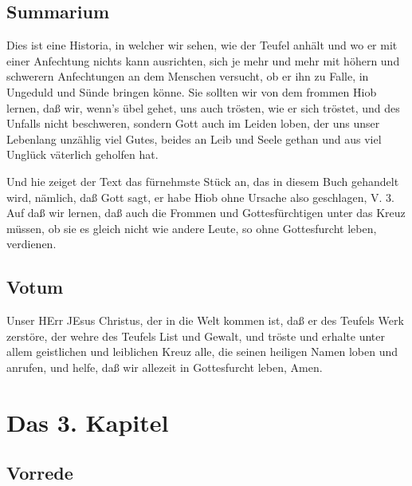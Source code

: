 \section{Summarium}

Dies ist eine Historia, in welcher wir sehen, wie der Teufel anhält und wo er mit einer Anfechtung nichts kann ausrichten, sich je mehr und mehr mit höhern und schwerern Anfechtungen an dem Menschen versucht, ob er ihn zu Falle, in Ungeduld und Sünde bringen könne. Sie sollten wir von dem frommen Hiob lernen, daß wir, wenn's übel gehet, uns auch trösten, wie er sich tröstet, und des Unfalls nicht beschweren, sondern Gott auch im Leiden loben, der uns unser Lebenlang unzählig viel Gutes, beides an Leib und Seele gethan und aus viel Unglück väterlich geholfen hat.

Und hie zeiget der Text das fürnehmste Stück an, das in diesem Buch gehandelt wird, nämlich, daß Gott sagt, er habe Hiob ohne Ursache also geschlagen, V. 3. Auf daß wir lernen, daß auch die Frommen und Gottesfürchtigen unter das Kreuz müssen, ob sie es gleich nicht wie andere Leute, so ohne Gottesfurcht leben, verdienen.

\section{Votum}

Unser HErr JEsus Christus, der in die Welt kommen ist, daß er des Teufels Werk zerstöre, der wehre des Teufels List und Gewalt, und tröste und erhalte unter allem geistlichen und leiblichen Kreuz alle, die seinen heiligen Namen loben und anrufen, und helfe, daß wir allezeit in Gottesfurcht leben, Amen.

\chapter{Das 3. Kapitel}

\section{Vorrede}


